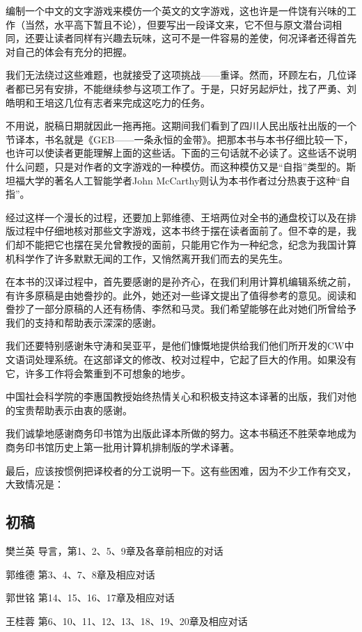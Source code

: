 编制一个中文的文字游戏来模仿一个英文的文字游戏，这也许是一件饶有兴味的工作（当然，水平高下暂且不论），但要写出一段译文来，它不但与原文潜台词相同，还要让读者同样有兴趣去玩味，这可不是一件容易的差使，何况译者还得首先对自己的体会有充分的把握。

我们无法绕过这些难题，也就接受了这项挑战——重译。然而，环顾左右，几位译者都已另有安排，不能继续参与这项工作了。于是，只好另起炉灶，找了严勇、刘皓明和王培这几位有志者来完成这吃力的任务。

不用说，脱稿日期就因此一拖再拖。这期间我们看到了四川人民出版社出版的一个节译本，书名就是《GEB——一条永恒的金带》。把那本书与本书仔细比较一下，也许可以使读者更能理解上面的这些话。下面的三句话就不必读了。这些话不说明什么问题，只是对作者的文字游戏的一种模仿。而这种模仿又是“自指”类型的。斯坦福大学的著名人工智能学者John McCarthy则认为本书作者过分热衷于这种“自指”。

经过这样一个漫长的过程，还要加上郭维德、王培两位对全书的通盘校订以及在排版过程中仔细地核对那些文字游戏，这本书终于摆在读者面前了。但不幸的是，我们却不能把它也摆在吴允曾教授的面前，只能用它作为一种纪念，纪念为我国计算机科学作了许多默默无闻的工作，又悄然离开我们而去的吴先生。

在本书的汉译过程中，首先要感谢的是孙齐心，在我们利用计算机编辑系统之前，有许多原稿是由她誊抄的。此外，她还对一些译文提出了值得参考的意见。阅读和誊抄了一部分原稿的人还有杨倩、李然和马灵。我们希望能够在此对她们所曾给予我们的支持和帮助表示深深的感谢。

我们还要特别感谢朱守涛和吴亚平，是他们慷慨地提供给我们他们所开发的CW中文语词处理系统。在这部译文的修改、校对过程中，它起了巨大的作用。如果没有它，许多工作将会繁重到不可想象的地步。

中国社会科学院的李惠国教授始终热情关心和积极支持这本译著的出版，我们对他的宝贵帮助表示由衷的感谢。

我们诚挚地感谢商务印书馆为出版此译本所做的努力。这本书稿还不胜荣幸地成为商务印书馆历史上第一批用计算机排制版的学术译著。

最后，应该按惯例把译校者的分工说明一下。这有些困难，因为不少工作有交叉，大致情况是：

\subsection*{初\quad 稿}

\begin{authorlist}
\item[樊兰英]导言，第1、2、5、9章及各章前相应的对话
\item[郭维德]第3、4、7、8章及相应对话
\item[郭世铭]第14、15、16、17章及相应对话
\item[王桂蓉]第6、10、11、12、13、18、19、20章及相应对话
\end{authorlist}

